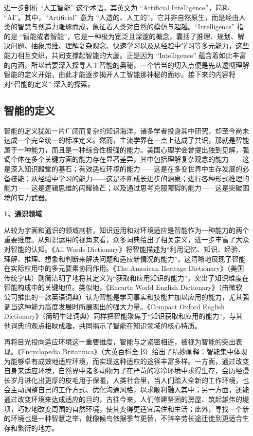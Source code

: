 进一步剖析 “人工智能” 这个术语，其英文为 “Artificial Intelligence”，简称 “AI”。其中，“Artificial” 意为 “人造的、人工的”，它并非自然原生，而是经由人类的智慧与创造力雕琢而成，象征着人类对自然的模仿与超越。“Intelligence” 指的是 “智能或者智能”，它是一种极为宽泛且深邃的概念，囊括了推理、规划、解决问题、抽象思维、理解复杂观念、快速学习以及从经验中学习等多元能力，这些能力相互交织，共同支撑起智能的大厦。正是因为 “Intelligence” 蕴含着如此丰富的内涵，所以若要深入探寻人工智能的奥秘，一个恰当的切入点便是先从透彻理解智能的定义开始，由此才能逐步揭开人工智能那神秘的面纱。接下来的内容将对“智能的定义” 深入的探索。


\subsection{智能的定义}
智能的定义犹如一片广阔而复杂的知识海洋，诸多学者投身其中研究，却至今尚未达成一个完全统一的标准定义。然而，主流学界在一点上达成了共识，那就是智能属于一种能力，而且是一种综合性极强的能力。美国心理学会曾提出独到见解，强调个体在多个关键方面的能力存在显著差异，其中包括理解复杂观念的能力——这是深入知识殿堂的基石；有效适应环境的能力——这是在多变世界中生存发展的必备技能；从经验中学习的能力——这是不断成长进步的源泉；进行各种形式推理的能力——这是逻辑思维的闪耀锋芒；以及通过思考克服障碍的能力——这是突破困境的有力武器。

\textbf{1、通识领域}


从较为字面和通识的领域剖析，知识运用和对环境适应是智能作为一种能力的两个重要维度。从知识运用的视角来看，众多词典给出了相关定义，进一步丰富了大众对智能的认知。《All Words Dictionary》将智能描述为“利用记忆、知识、经验、理解、推理、想象和判断来解决问题和适应新情况的能力”，这清晰地展现了智能在实际应用中的多元要素协同作用。《The American Heritage Dictionary》（美国传统字典）则简洁明了地将其定义为“获取和应用知识的能力”，突出了知识维度在智能构成中的关键地位。类似地，《Encarta World English Dictionary》（由微软公司推出的一款英语词典）认为智能是学习事实和技能并加以应用的能力，尤其强调当这种能力高度发展时所展现出的强大力量。《Compact Oxford English Dictionary》（简明牛津词典）同样把智能聚焦于“知识获取和应用的能力”，与其他词典的观点相映成趣，共同揭示了智能在知识领域的核心特质。


再将目光投向适应环境这一重要维度，智能与之紧密相连，被视为智能的突出表现。《Encyclopedia Britannica》（大英百科全书）给出了精妙阐释：智能集中体现为能够卓有成效地适应环境，而实现这种适应的途径丰富多样。一方面，通过改变自身来适应环境，自然界中诸多动物为了在严苛的寒冷环境中求得生存，会历经漫长岁月进化出更厚的皮毛用于保暖，人类社会里，当人们踏入全新的工作环境，也会主动调整自己的工作方式、优化沟通风格，以求顺利融入其中；另一方面，还能通过改变环境来达成适应的目的，古往今来，人们修建坚固的房屋、筑起雄伟的堤坝，巧妙地改变周围的自然环境，使其变得更适宜居住和生活；此外，寻找一个新的环境也是一种智慧之举，就像候鸟依据季节更替，不辞辛劳长途迁徙到更适合生存和繁衍的地方。


